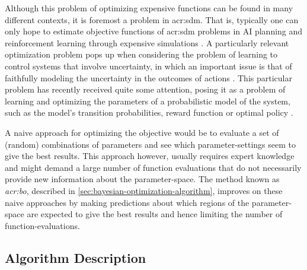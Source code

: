Although this problem of optimizing expensive functions can be found in many different contexts, it is foremost a problem in \acrshort{acr:sdm}. 
That is, typically one can only hope to estimate objective functions of \acrshort{acr:sdm} problems in AI planning and reinforcement learning through expensive simulations \cite{Brochu2010}. 
A particularly relevant optimization problem pops up when considering the problem of learning to control systems that involve uncertainty, in which an important issue is that of faithfully modeling the uncertainty in the outcomes of actions \cite{Ghahramani2015}.
This particular problem has recently received quite some attention, posing it as a problem of learning and optimizing the parameters of a probabilistic model of the system, such as the model's transition probabilities, reward function or optimal policy \cite{Poupart2010}.

A naive approach for optimizing the objective would be to evaluate a set of (random) combinations of parameters and see which parameter-settings seem to give the best results.
This approach however, usually requires expert knowledge and might demand a large number of function evaluations that do not necessarily provide new information about the parameter-space.
The method known as \textit{\acrlong{acr:bo}}, described in \autoref{sec:bayesian-optimization-algorithm}, improves on these naive approaches by making predictions about which regions of the parameter-space are expected to give the best results and hence limiting the number of function-evaluations.

\subsection{Algorithm Description}
\label{sec:bayesian-optimization-algorithm}


